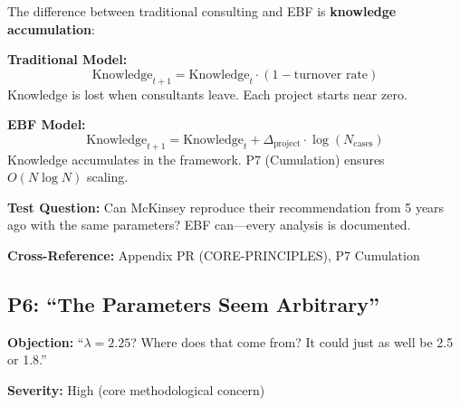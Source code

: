 \begin{axiom}
The difference between traditional consulting and EBF is \textbf{knowledge accumulation}:

\textbf{Traditional Model:}
\begin{equation}
\text{Knowledge}_{t+1} = \text{Knowledge}_t \cdot (1 - \text{turnover rate})
\end{equation}
Knowledge is lost when consultants leave. Each project starts near zero.

\textbf{EBF Model:}
\begin{equation}
\text{Knowledge}_{t+1} = \text{Knowledge}_t + \Delta_{\text{project}} \cdot \log(N_{\text{cases}})
\end{equation}
Knowledge accumulates in the framework. P7 (Cumulation) ensures $O(N \log N)$ scaling.

\textbf{Test Question:} Can McKinsey reproduce their recommendation from 5 years ago
with the same parameters? EBF can---every analysis is documented.
\end{axiom}

\textbf{Cross-Reference:} Appendix PR (CORE-PRINCIPLES), P7 Cumulation

\subsection{P6: ``The Parameters Seem Arbitrary''}
\label{sec:da-p6}

\begin{tcolorbox}[colback=gray!5!white, colframe=gray!75!black]
\textbf{Objection:} ``$\lambda = 2.25$? Where does that come from?
It could just as well be 2.5 or 1.8.''

\textbf{Severity:} High (core methodological concern)
\end{tcolorbox}

